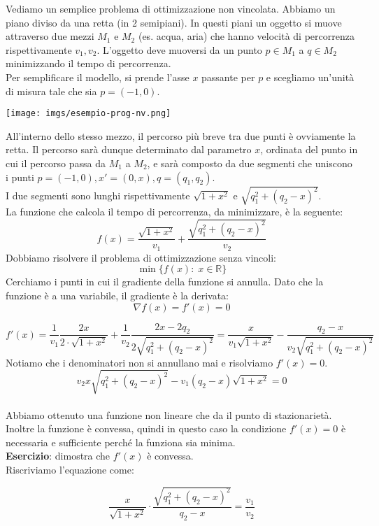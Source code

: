 \begin{example}
\label{esempio-prog-nv} Vediamo un semplice problema di ottimizzazione
non vincolata. Abbiamo un piano diviso da una retta (in 2
semipiani). In questi piani un oggetto si muove attraverso due mezzi
$M_1$ e $M_2$ (es. acqua, aria) che hanno velocit\`a di percorrenza
rispettivamente $v_1, v_2$. L'oggetto deve muoversi da un punto $p \in
M_1$ a $q \in M_2$ minimizzando il tempo di percorrenza.\\ Per
semplificare il modello, si prende l'asse $x$ passante per $p$ e
scegliamo un'unit\`a di misura tale che sia $p=(-1,0)$.

\centerline{\texttt{[image: imgs/esempio-prog-nv.png]}}

All'interno dello stesso mezzo, il percorso pi\`u breve tra due punti \`e
ovviamente la retta. Il percorso sar\`a dunque determinato dal parametro
$x$, ordinata del punto in cui il percorso passa da $M_1$ a $M_2$, e
sar\`a composto da due segmenti che uniscono i punti $p=(-1,0),
x'=(0,x), q=(q_1, q_2)$.\\ I due segmenti sono lunghi rispettivamente
$\sqrt{1+x^2}$ e $\sqrt{q_1^2 + (q_2 - x)^2}$.\\ La funzione che
calcola il tempo di percorrenza, da minimizzare, \`e la seguente:
$$f(x) =  \frac{\sqrt{1+x^2}}{v_1} + \frac{\sqrt{q_1^2 + (q_2 - x)^2}}{v_2}$$
Dobbiamo risolvere il problema di ottimizzazione senza vincoli:
$$ \min\{f(x):\; x \in \mathbb{R}\}$$
Cerchiamo i punti in cui il gradiente della funzione si annulla. Dato
che la funzione \`e a una variabile, il gradiente \`e la derivata:
$$\nabla f(x)= f'(x)=0$$

$$f'(x) = \frac{1}{v_1} \frac{2x}{2 \cdot \sqrt{1+x^2}} + \frac{1}{v_2} \frac{2x - 2q_2}{2\sqrt{q_1^2 + (q_2 - x)^2}} = \frac{x}{v_1\sqrt{1+x^2}} - \frac{{q_2 - x}}{v_2 \sqrt{q_1^{2} + (q_2 -x)^2}}
$$
Notiamo che i denominatori non si annullano mai e risolviamo $f'(x) =
0$.
$$ v_2 x \sqrt{q_1^2 + (q_2 -x)^2} - v_1(q_2 -x)\sqrt{1+x^2}=0$$ \\
Abbiamo ottenuto una funzione non lineare che da il punto di
stazionariet\`a. Inoltre la funzione \`e convessa, quindi in questo caso
la condizione $f'(x)=0$ \`e necessaria e sufficiente perch\'e la funziona
sia minima. \\ \textbf{Esercizio}: dimostra che $f'(x)$ \`e convessa.\\
Riscriviamo l'equazione come:

\begin{equation}
\label{eq:esempio-ottimizzazione-nv-1} \frac{x}{\sqrt{1+x^2}} \cdot
\frac{\sqrt{q_1^2 + (q_2-x)^2}}{q_2 -x} =\frac{v_1}{v_2}
\end{equation}


\end{example}
